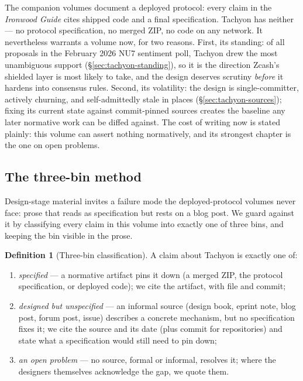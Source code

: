 \documentclass[11pt,a4paper]{article}
\theoremstyle{definition}
\newtheorem{definition}[theorem]{Definition}
\begin{document}
The companion volumes document a deployed protocol: every claim in the
\emph{Ironwood Guide} cites shipped code and a final specification. Tachyon has
neither --- no protocol specification, no merged ZIP, no code on any network.
It nevertheless warrants a volume now, for two reasons. First, its standing:
of all proposals in the February 2026 NU7 sentiment poll, Tachyon drew the
most unambiguous support (\S\ref{sec:tachyon-standing}), so it is the
direction Zcash's shielded layer is most likely to take, and the design
deserves scrutiny \emph{before} it hardens into consensus rules. Second, its
volatility: the design is single-committer, actively churning, and
self-admittedly stale in places
(\S\ref{sec:tachyon-sources}); fixing its current state against commit-pinned
sources creates the baseline any later normative work can be diffed against.
The cost of writing now is stated plainly: this volume can assert nothing
normatively, and its strongest chapter is the one on open problems.

\subsection{The three-bin method}\label{sec:tachyon-bins}

Design-stage material invites a failure mode the deployed-protocol volumes
never face: prose that reads as specification but rests on a blog post. We
guard against it by classifying every claim in this volume into exactly one of
three bins, and keeping the bin visible in the prose.

\begin{definition}[Three-bin classification]\label{def:three-bins}
A claim about Tachyon is exactly one of:
\begin{enumerate}[label=(\roman*)]
\item \emph{specified} --- a normative artifact pins it down (a merged ZIP, the
  protocol specification, or deployed code); we cite the artifact, with file
  and commit;
\item \emph{designed but unspecified} --- an informal source (design book,
  eprint note, blog post, forum post, issue) describes a concrete mechanism,
  but no specification fixes it; we cite the source and its date (plus commit
  for repositories) and state what a specification would still need to pin
  down;
\item \emph{an open problem} --- no source, formal or informal, resolves it;
  where the designers themselves acknowledge the gap, we quote them.
\end{enumerate}
\end{definition}
\end{document}
